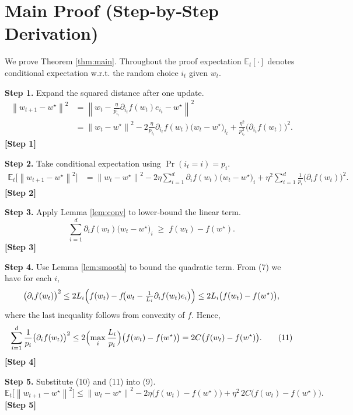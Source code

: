 \documentclass{article}
\newcommand{\E}{\mathbb{E}}
\newcommand{\norm}[1]{\left\|#1\right\|}
\begin{document}
\section*{Main Proof (Step‑by‑Step Derivation)}
We prove Theorem \ref{thm:main}. Throughout the proof expectation $\E_t[\cdot]$ denotes conditional expectation w.r.t. the random choice $i_t$ given $w_t$.

\noindent\textbf{Step 1.}  Expand the squared distance after one update.
\[
\begin{aligned}
\norm{w_{t+1}-w^\star}^{2}
&=\norm{w_t-\frac{\eta}{p_{i_t}}\partial_{i_t}f(w_t)e_{i_t}-w^\star}^{2}\\
&=\norm{w_t-w^\star}^{2}
-2\frac{\eta}{p_{i_t}}\partial_{i_t}f(w_t)\bigl(w_t-w^\star\bigr)_{i_t}
+\frac{\eta^{2}}{p_{i_t}^{2}}\bigl(\partial_{i_t}f(w_t)\bigr)^{2}.
\end{aligned}
\tag{8}
\]
\textbf{[Step 1]}

\noindent\textbf{Step 2.}  Take conditional expectation using $\Pr(i_t=i)=p_i$.
\[
\begin{aligned}
\E_t\!\bigl[\norm{w_{t+1}-w^\star}^{2}\bigr]
&=\norm{w_t-w^\star}^{2}
-2\eta\sum_{i=1}^{d}\partial_i f(w_t)\bigl(w_t-w^\star\bigr)_i
+\eta^{2}\sum_{i=1}^{d}\frac{1}{p_i}\bigl(\partial_i f(w_t)\bigr)^{2}.
\end{aligned}
\tag{9}
\]
\textbf{[Step 2]}

\noindent\textbf{Step 3.}  Apply Lemma \ref{lem:conv} to lower‑bound the linear term.
\[
\sum_{i=1}^{d}\partial_i f(w_t)\bigl(w_t-w^\star\bigr)_i
\;\ge\; f(w_t)-f(w^\star).
\tag{10}
\]
\textbf{[Step 3]}

\noindent\textbf{Step 4.}  Use Lemma \ref{lem:smooth} to bound the quadratic term.
From (7) we have for each $i$,
\[
\bigl(\partial_i f(w_t)\bigr)^{2}
\le 2L_i\Bigl(f(w_t)-f\!\bigl(w_t-\tfrac{1}{L_i}\partial_i f(w_t)e_i\bigr)\Bigr)
\le 2L_i\bigl(f(w_t)-f(w^\star)\bigr),
\]
where the last inequality follows from convexity of $f$.
Hence,
\[
\sum_{i=1}^{d}\frac{1}{p_i}\bigl(\partial_i f(w_t)\bigr)^{2}
\le 2\Bigl(\max_{i}\frac{L_i}{p_i}\Bigr)\bigl(f(w_t)-f(w^\star)\bigr)
=2C\bigl(f(w_t)-f(w^\star)\bigr).
\tag{11}
\]
\textbf{[Step 4]}

\noindent\textbf{Step 5.}  Substitute (10) and (11) into (9).
\[
\E_t\!\bigl[\norm{w_{t+1}-w^\star}^{2}\bigr]
\le \norm{w_t-w^\star}^{2}
-2\eta\bigl(f(w_t)-f(w^\star)\bigr)
+\eta^{2}\,2C\bigl(f(w_t)-f(w^\star)\bigr).
\tag{12}
\]
\textbf{[Step 5]}
\end{document}
